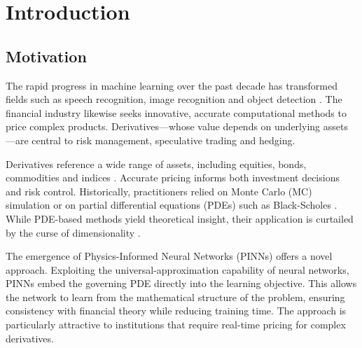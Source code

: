 \documentclass[12pt]{report} %
\theoremstyle{plain}           %
\theoremstyle{definition}      %
\theoremstyle{remark}          %
\begin{document}

\tableofcontents
\thispagestyle{fancy}

\newpage %
\thispagestyle{empty}
\mbox{}

\listoffigures
\thispagestyle{fancy}

\newpage %
\thispagestyle{empty}
\mbox{}

\listoftables
\thispagestyle{fancy}

\newpage %
\thispagestyle{empty}
\mbox{}


\clearpage
{} %

\chapter{Introduction}

\section{Motivation}


The rapid progress in machine learning over the past decade has transformed
fields such as speech recognition, image recognition and object detection \cite{lecun}.
The financial industry likewise seeks innovative, accurate computational methods
to price complex products. Derivatives—whose value depends on underlying assets
\cite{alma99148840908702021}—are central to risk management, speculative trading and hedging.

Derivatives reference a wide range of assets, including equities, bonds, commodities and indices
\cite{Wilmott2010PaulWO}. Accurate pricing informs both investment decisions and risk control.
Historically, practitioners relied on Monte Carlo (MC) simulation \cite{glasserman2004monte} or
on partial differential equations (PDEs) such as Black-Scholes \cite{blackscholes}.
While PDE-based methods yield theoretical insight, their application is curtailed by the curse of dimensionality \cite{bellman1966dynamic}.

The emergence of Physics-Informed Neural Networks (PINNs) \cite{RAISSI2019686}
offers a novel approach. Exploiting the universal-approximation capability of neural networks,
PINNs embed the governing PDE directly into the learning objective. This allows
the network to learn from the mathematical structure of the problem, ensuring consistency
with financial theory while reducing training time. The approach is particularly attractive to
institutions that require real-time pricing for complex derivatives.
\end{document}
